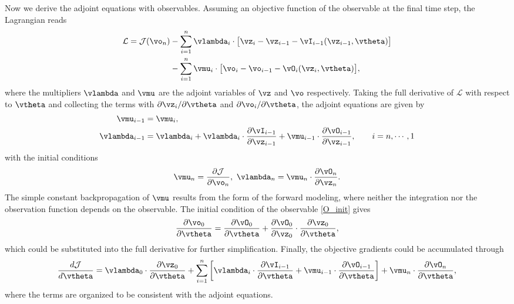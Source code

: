 \documentclass[modern, trackchanges, dvipsnames]{aastex631}
\newcommand{\p}{\partial}
\newcommand{\cJ}{\mathcal{J}}
\newcommand{\cL}{\mathcal{L}}
\begin{document}
Now we derive the adjoint equations with observables.
Assuming an objective function of the observable at the final time step,
the Lagrangian reads
\begin{align}
\cL = \cJ(\vo_n)
&- \sum_{i=1}^{n} \vlambda_i
  \cdot \bigl[ \vz_i - \vz_{i-1} - \vI_{i-1}(\vz_{i-1}, \vtheta) \bigr] \nonumber\\
&- \sum_{i=1}^{n} \vmu_i
  \cdot \bigl[ \vo_i - \vo_{i-1} - \vO_i(\vz_i, \vtheta) \bigr],
\label{IO_Lagrangian}
\end{align}
where the multipliers $\vlambda$ and $\vmu$ are the adjoint variables of
$\vz$ and $\vo$ respectively.
Taking the full derivative of $\cL$ with respect to $\vtheta$ and
collecting the terms with $\p\vz_i/\p\vtheta$ and $\p\vo_i/\p\vtheta$,
the adjoint equations are given by
\begin{align}
\vmu_{i-1} &= \vmu_i, \\
\vlambda_{i-1} &= \vlambda_i
  + \vlambda_i\cdot\frac{\p\vI_{i-1}}{\p\vz_{i-1}}
  + \vmu_{i-1}\cdot\frac{\p\vO_{i-1}}{\p\vz_{i-1}}, \qquad i=n,\cdots,1
\label{IO_adj}
\end{align}
with the initial conditions
\begin{equation}
\vmu_n = \frac{\p\cJ}{\p\vo_n},\
\vlambda_n = \vmu_n\cdot\frac{\p\vO_n}{\p\vz_n}.
\label{IO_adj_init}
\end{equation}
The simple constant backpropagation of $\vmu$ results from the form of
the forward modeling, where neither the integration nor the observation
function depends on the observable.
The initial condition of the observable \eqref{O_init} gives
\begin{equation}
\frac{\p\vo_0}{\p\vtheta} = \frac{\p\vO_0}{\p\vtheta}
+ \frac{\p\vO_0}{\p\vz_0}\cdot\frac{\p\vz_0}{\p\vtheta},
\end{equation}
which could be substituted into the full derivative for further
simplification.
Finally, the objective gradients could be accumulated through
\begin{align}
\frac{d\cJ}{d\vtheta} =
\vlambda_0\cdot\frac{\p\vz_0}{\p\vtheta}
+ \sum_{i=1}^{n} \left[\vlambda_i\cdot\frac{\p\vI_{i-1}}{\p\vtheta}
+ \vmu_{i-1}\cdot\frac{\p\vO_{i-1}}{\p\vtheta}\right]
+ \vmu_{n}\cdot\frac{\p\vO_{n}}{\p\vtheta},
\label{IO_grad}
\end{align}
where the terms are organized to be consistent with the adjoint
equations.
\end{document}
